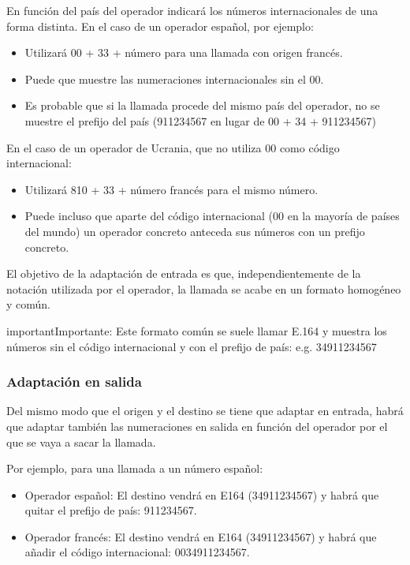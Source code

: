 \documentclass[letterpaper,10pt,spanish]{sphinxmanual}
\begin{document}
En función del país del operador indicará los números internacionales de una forma distinta. En el caso de un operador español, por ejemplo:
\begin{itemize}
\item {} 
Utilizará 00 + 33 + número para una llamada con origen francés.

\item {} 
Puede que muestre las numeraciones internacionales sin el 00.

\item {} 
Es probable que si la llamada procede del mismo país del operador, no se muestre el prefijo del país (911234567 en lugar de 00 + 34 + 911234567)

\end{itemize}

En el caso de un operador de Ucrania, que no utiliza 00 como código internacional:
\begin{itemize}
\item {} 
Utilizará 810 + 33 + número francés para el mismo número.

\item {} 
Puede incluso que aparte del código internacional (00 en la mayoría de países del mundo) un operador concreto anteceda sus números con un prefijo concreto.

\end{itemize}

El objetivo de la adaptación de entrada es que, independientemente de la notación utilizada por el operador, la llamada se acabe en un formato homogéneo y común.
\label{external_incoming_calls/numeric_transformations:e164}
\begin{notice}{important}{Importante:}
Este formato común se suele llamar E.164 y muestra los números sin el código internacional y con el prefijo de país: e.g. 34911234567
\end{notice}


\subsubsection{Adaptación en salida}
\label{external_incoming_calls/numeric_transformations:adaptacion-en-salida}
Del mismo modo que el origen y el destino se tiene que adaptar en entrada, habrá que adaptar también las numeraciones en salida en función del operador por el que se vaya a sacar la llamada.

Por ejemplo, para una llamada a un número español:
\begin{itemize}
\item {} 
Operador español: El destino vendrá en E164 (34911234567) y habrá que quitar el prefijo de país: 911234567.

\item {} 
Operador francés: El destino vendrá en E164 (34911234567) y habrá que añadir el código internacional: 0034911234567.

\end{itemize}
\end{document}
